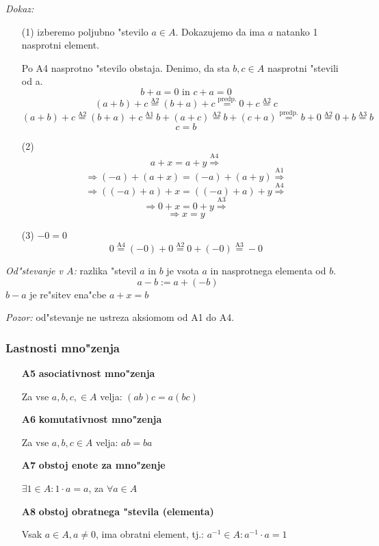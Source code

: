\emph{Dokaz:}
\begin{itemize}
	\item[(1)] izberemo poljubno "stevilo \(a \in A\). Dokazujemo da ima \(a\) natanko 1 nasprotni element.
	
	Po A4 nasprotno "stevilo obstaja. Denimo, da sta \(b, c \in A\) nasprotni "stevili od a.
	\[b + a = 0\text{ in }c + a = 0 \]
	\[(a + b) + c \stackrel{\text{A2}}{=} (b + a) + c \stackrel{\text{predp.}}{=} 0 + c \stackrel{\text{A2}}{=} c\]
	\[(a + b) + c\stackrel{\text{A2}}{=} (b + a) + c \stackrel{\text{A1}}{=} b + (a + c) \stackrel{\text{A2}}{=} b + (c + a) \stackrel{\text{predp.}}{=} b + 0 \stackrel{\text{A2}}{=} 0 + b \stackrel{\text{A3}}{=} b \]
	\[c = b\]
	
	\item[(2)]
	\[a + x = a + y \stackrel{\text{A4}}{\Rightarrow}\]
	\[\Rightarrow (-a) + (a + x) = (-a) + (a + y) \stackrel{\text{A1}}{\Rightarrow}\]
	\[\Rightarrow ((-a) + a) + x = ((-a) + a) + y \stackrel{\text{A4}}{\Rightarrow}\]
	\[\Rightarrow 0 + x = 0 + y \stackrel{\text{A3}}{\Rightarrow}\]
	\[\Rightarrow x = y\]
	
	\item[(3)] \(-0 = 0\)
	\[0 \stackrel{\text{A4}}{=} (-0) + 0 \stackrel{\text{A2}}{=} 0 + (-0) \stackrel{\text{A3}}{=} -0\]
\end{itemize}

\emph{Od"stevanje v \(A\):} razlika "stevil \(a\) in \(b\) je vsota \(a\) in nasprotnega elementa od \(b\).
\[a - b := a + (-b)\]
\(b-a\) je re"sitev ena"cbe \(a + x = b\)

\emph{Pozor:} od"stevanje ne ustreza aksiomom od A1 do A4.

\subsubsection*{Lastnosti mno"zenja}
\begin{itemize}
	\item[\textbf{A5}] \textbf{asociativnost mno"zenja}
	
	Za vse \(a, b, c, \in A\) velja: \((ab)c = a(bc)\)
	\item[\textbf{A6}] \textbf{komutativnost mno"zenja}
	
	Za vse \(a, b, c \in A\) velja: \(ab = ba\)
	\item[\textbf{A7}] \textbf{obstoj enote za mno"zenje}
	
	\(\exists 1 \in A: 1 \cdot a = a\), za \(\forall a \in A\)
	\item[\textbf{A8}] \textbf{obstoj obratnega "stevila (elementa)}
	
	Vsak \(a \in A, a \neq 0\), ima obratni element, tj.: \(a^{-1} \in A: a^{-1} \cdot a = 1\)
\end{itemize}

